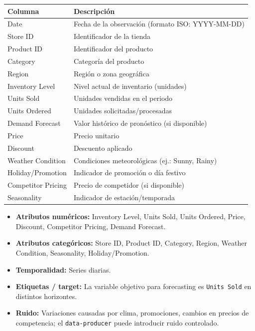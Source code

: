 \documentclass[12pt,a4paper]{article}
\begin{document}
	\begin{table}[h!]
		\centering
		\begin{tabular}{@{}ll@{}}
			\toprule
			\textbf{Columna} & \textbf{Descripción} \\ \midrule
			Date & Fecha de la observación (formato ISO: YYYY-MM-DD) \\
			Store ID & Identificador de la tienda \\
			Product ID & Identificador del producto \\
			Category & Categoría del producto \\
			Region & Región o zona geográfica \\
			Inventory Level & Nivel actual de inventario (unidades) \\
			Units Sold & Unidades vendidas en el periodo \\
			Units Ordered & Unidades solicitadas/procesadas \\
			Demand Forecast & Valor histórico de pronóstico (si disponible) \\
			Price & Precio unitario \\
			Discount & Descuento aplicado \\
			Weather Condition & Condiciones meteorológicas (ej.: Sunny, Rainy) \\
			Holiday/Promotion & Indicador de promoción o día festivo \\
			Competitor Pricing & Precio de competidor (si disponible) \\
			Seasonality & Indicador de estación/temporada \\ \bottomrule
		\end{tabular}
	\end{table}
	
	\begin{itemize}
		\item \textbf{Atributos numéricos:} Inventory Level, Units Sold, Units Ordered, Price, Discount, Competitor Pricing, Demand Forecast.
		\item \textbf{Atributos categóricos:} Store ID, Product ID, Category, Region, Weather Condition, Seasonality, Holiday/Promotion.
		\item \textbf{Temporalidad:} Series diarias.
		\item \textbf{Etiquetas / target:} La variable objetivo para forecasting es \texttt{Units Sold} en distintos horizontes.
		\item \textbf{Ruido:} Variaciones causadas por clima, promociones, cambios en precios de competencia; el \texttt{data-producer} puede introducir ruido controlado.
		
	\end{itemize}
	
\end{document}
